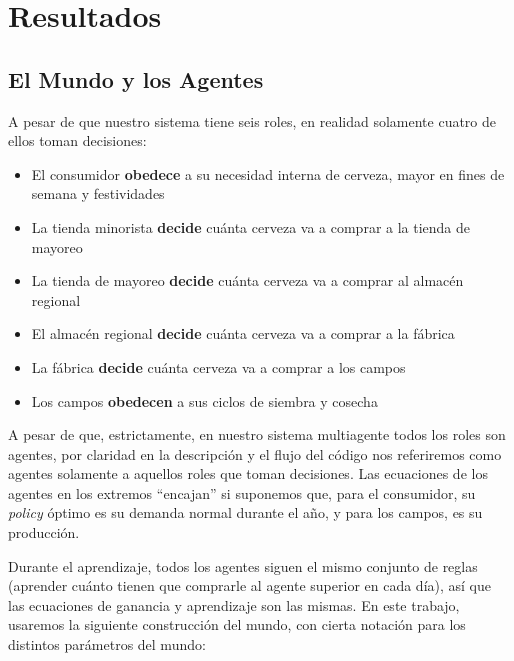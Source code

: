 \chapter{Resultados}

\section{El Mundo y los Agentes}

A pesar de que nuestro sistema tiene seis roles, en realidad solamente cuatro de ellos toman decisiones:

\begin{itemize}
    \item El consumidor \textbf{obedece} a su necesidad interna de cerveza, mayor en fines de semana y festividades
    \item La tienda minorista \textbf{decide} cu\'anta cerveza va a comprar a la tienda de mayoreo
    \item La tienda de mayoreo \textbf{decide} cu\'anta cerveza va a comprar al almac\'en regional
    \item El almac\'en regional \textbf{decide} cu\'anta cerveza va a comprar a la f\'abrica
    \item La f\'abrica \textbf{decide} cu\'anta cerveza va a comprar a los campos
    \item Los campos \textbf{obedecen} a sus ciclos de siembra y cosecha
\end{itemize}

A pesar de que, estrictamente, en nuestro sistema multiagente todos los roles son agentes, por claridad en la descripci\'on y el flujo del c\'odigo nos referiremos como agentes solamente a aquellos roles que toman decisiones. Las ecuaciones de los agentes en los extremos ``encajan'' si suponemos que, para el consumidor, su \textit{policy} \'optimo es su demanda normal durante el a\~no, y para los campos, es su producci\'on.

Durante el aprendizaje, todos los agentes siguen el mismo conjunto de reglas (aprender cu\'anto tienen que comprarle al agente superior en cada d\'ia), as\'i que las ecuaciones de ganancia y aprendizaje son las mismas. En este trabajo, usaremos la siguiente construcci\'on del mundo, con cierta notaci\'on para los distintos par\'ametros del mundo:

